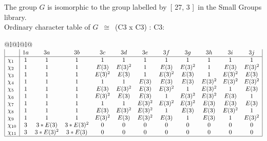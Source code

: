 \documentclass[varwidth=\maxdimen,border=10]{standalone}
\begin{document}
The group $G$ is isomorphic to the group labelled by\ [ 27, 3 ]\ in the Small Groups library.\\
Ordinary character table of $G$\ $\cong$\ (C3 x C3) : C3:\\
\begin{center}
\begin{tabular}{@{}l@{}l@{}l@{}}
\hline
\(\begin{array}{|l|ccccccccccc|}
  & 1a & 3a & 3b & 3c & 3d & 3e & 3f & 3g & 3h & 3i & 3j\\ \hline
\chi_{1} & 1 & 1 & 1 & 1 & 1 & 1 & 1 & 1 & 1 & 1 & 1\\
\chi_{2} & 1 & 1 & 1 & E(3) & E(3)^{2} & 1 & E(3) & E(3)^{2} & 1 & E(3) & E(3)^{2}\\
\chi_{3} & 1 & 1 & 1 & E(3)^{2} & E(3) & 1 & E(3)^{2} & E(3) & 1 & E(3)^{2} & E(3)\\
\chi_{4} & 1 & 1 & 1 & 1 & 1 & E(3) & E(3) & E(3) & E(3)^{2} & E(3)^{2} & E(3)^{2}\\
\chi_{5} & 1 & 1 & 1 & E(3) & E(3)^{2} & E(3) & E(3)^{2} & 1 & E(3)^{2} & 1 & E(3)\\
\chi_{6} & 1 & 1 & 1 & E(3)^{2} & E(3) & E(3) & 1 & E(3)^{2} & E(3)^{2} & E(3) & 1\\
\chi_{7} & 1 & 1 & 1 & 1 & 1 & E(3)^{2} & E(3)^{2} & E(3)^{2} & E(3) & E(3) & E(3)\\
\chi_{8} & 1 & 1 & 1 & E(3) & E(3)^{2} & E(3)^{2} & 1 & E(3) & E(3) & E(3)^{2} & 1\\
\chi_{9} & 1 & 1 & 1 & E(3)^{2} & E(3) & E(3)^{2} & E(3) & 1 & E(3) & 1 & E(3)^{2}\\
\chi_{10} & 3 & 3*E(3) & 3*E(3)^{2} & 0 & 0 & 0 & 0 & 0 & 0 & 0 & 0\\
\chi_{11} & 3 & 3*E(3)^{2} & 3*E(3) & 0 & 0 & 0 & 0 & 0 & 0 & 0 & 0\\
\hline
\end{array}\)\\
\end{tabular}
\end{center}
\end{document}
